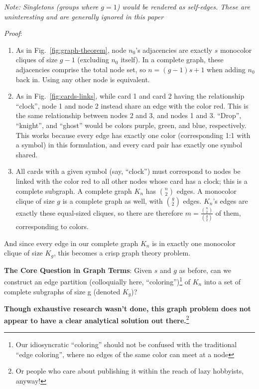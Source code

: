 \documentclass[11pt, oneside]{article} 	%
\begin{document}
\emph{Note: Singletons (groups where $g=1$) would be rendered as self-edges.  These are uninteresting and are generally ignored in this paper}

\emph{Proof}:
\begin{enumerate}
\item As in Fig.~\ref{fig:graph-theorem}, node $n_0$'s adjacencies are exactly $s$ monocolor cliques of size $g-1$ (excluding $n_0$ itself).  In a complete graph, these adjacencies comprise the total node set, so $n = (g-1)s + 1$ when adding $n_0$ back in.  Using any other node is equivalent.
\item As in Fig.~\ref{fig:cards-links}, while card 1 and card 2 having the relationship ``clock'', node 1 and node 2 instead share an edge with the color red.  This is the same relationship between nodes 2 and 3, and nodes 1 and 3.  ``Drop'', ``knight'', and ``ghost'' would be colors purple, green, and blue, respectively.  This works because every edge has exactly one color (corresponding 1:1 with a symbol) in this formulation, and every card pair has exactly one symbol shared.
\item All cards with a given symbol (say, ``clock'') must correspond to nodes be linked with the color red to all other nodes whose card has a clock; this is a complete subgraph.  A complete graph $K_n$ has ${n \choose 2}$ edges.  A monocolor clique of size $g$ is a complete graph as well, with ${g \choose 2}$ edges.  $K_n$'s edges are exactly these equal-sized cliques, so there are therefore $m = \frac{{n \choose 2}}{{g \choose 2}}$ of them, corresponding to colors.
\end{enumerate}

And since every edge in our complete graph $K_n$ is in exactly one monocolor clique of size $K_g$, this becomes a crisp graph theory problem.

\begin{framed}
\textbf{The Core Question in Graph Terms}: Given $s$ and $g$ as before, can we construct an edge partition (colloquially here, ``coloring'')\footnote{Our idiosyncratic ``coloring'' should not be confused with the traditional ``edge coloring'', where no edges of the same color can meet at a node} of $K_n$ into a set of complete subgraphs of size g (denoted $K_g$)?
\end{framed}
\textbf{Though exhaustive research wasn't done, this graph problem does not appear to have a clear analytical solution out there.}\footnote{Or people who care about publishing it within the reach of lazy hobbyists, anyway!}
\end{document}
